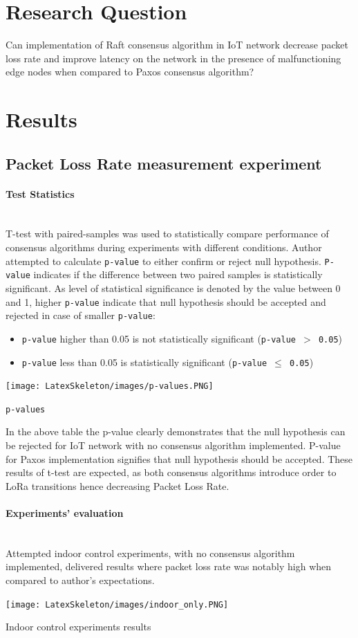 \documentclass[oneside,12pt]{book}
\newcommand{\myparagraph}[1]{\paragraph{#1}\mbox{}\\}
\begin{document}
\section{Research Question}
Can implementation of Raft consensus algorithm in IoT network decrease packet loss rate and improve latency on the network in the presence of malfunctioning edge nodes when compared to Paxos consensus algorithm?
\section{Results}
\subsection{Packet Loss Rate measurement experiment}
\myparagraph{Test Statistics}
T-test with paired-samples was used to statistically compare performance of consensus algorithms during experiments with different conditions. Author attempted to calculate \texttt{p-value} to either confirm or reject null hypothesis. \texttt{P-value} indicates if the difference between two paired samples is statistically significant. As level of statistical significance is denoted by the value between 0 and 1, higher \texttt{p-value} indicate that null hypothesis should be accepted and rejected in case of smaller \texttt{p-value}:
\begin{itemize}
  \item \texttt{p-value} higher than 0.05 is not statistically significant (\texttt{p-value $>$ 0.05})   
  \item \texttt{p-value} less than 0.05 is statistically significant (\texttt{p-value $\leq$ 0.05})
\end{itemize}
\begin{table}[H]
  \centering
  \label{tbl:p-values}
  \texttt{[image: LatexSkeleton/images/p-values.PNG]}
  \caption{\texttt{p-values}}
\end{table}
In the above table the p-value clearly demonstrates that the null hypothesis can be rejected for IoT network with no consensus algorithm implemented. P-value for Paxos implementation signifies that null hypothesis should be accepted. These results of t-test are expected, as both consensus algorithms introduce order to LoRa transitions hence decreasing Packet Loss Rate. 
\myparagraph{Experiments’ evaluation}
Attempted indoor control experiments, with no consensus algorithm implemented, delivered results where packet loss rate was notably high when compared to author’s expectations.
\begin{table}[H]
  \centering
  \label{tbl:Indoor control experiments results}
  \texttt{[image: LatexSkeleton/images/indoor\_only.PNG]}
  \caption{Indoor control experiments results}
\end{table}
\end{document}
